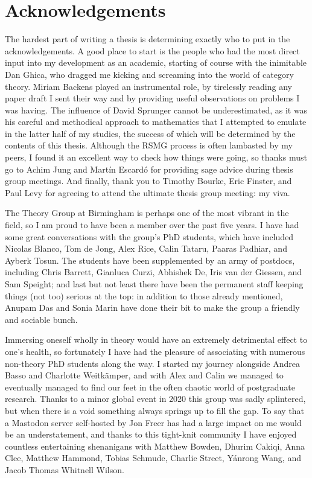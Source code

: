 \chapter{Acknowledgements}\label{chap:acknowledgements}

The hardest part of writing a thesis is determining exactly who to put in the
acknowledgements.
A good place to start is the people who had the most direct input into my
development as an academic, starting of course with the inimitable Dan Ghica,
who dragged me kicking and screaming into the world of category theory.
Miriam Backens played an instrumental role, by tirelessly reading any paper
draft I sent their way and by providing useful observations on problems I was
having.
The influence of David Sprunger cannot be underestimated, as it was his
careful and methodical approach to mathematics that I attempted to emulate in
the latter half of my studies, the success of which will be determined by the
contents of this thesis.
Although the RSMG process is often lambasted by my peers, I found it an
excellent way to check how things were going, so thanks must go to Achim Jung
and Martín Escardó for providing sage advice during thesis group meetings.
And finally, thank you to Timothy Bourke, Eric Finster, and Paul Levy for
agreeing to attend the ultimate thesis group meeting: my viva.

The Theory Group at Birmingham is perhaps one of the most vibrant in the field,
so I am proud to have been a member over the past five years.
I have had some great conversations with the group's PhD students, which have
included Nicolas Blanco, Tom de Jong, Alex Rice, Calin Tataru,
Paaras Padhiar, and Ayberk Tosun.
The students have been supplemented by an army of postdocs,
including Chris Barrett, Gianluca Curzi, Abhishek De, Iris van der Giessen, and
Sam Speight; and last but not least there have been the permanent staff keeping
things (not too) serious at the top: in addition to those already mentioned,
Anupam Das and Sonia Marin have done their bit to make the group a friendly and
sociable bunch.

Immersing oneself wholly in theory would have an extremely detrimental effect to
one's health, so fortunately I have had the pleasure of associating with
numerous non-theory PhD students along the way.
I started my journey alongside Andrea Basso and Charlotte Weitkämper, and with
Alex and Calin we managed to eventually managed to find our feet in the often
chaotic world of postgraduate research.
Thanks to a minor global event in 2020 this group was sadly splintered, but when
there is a void something always springs up to fill the gap.
To say that a Mastodon server self-hosted by Jon Freer has had a large impact on
me would be an understatement, and thanks to this tight-knit community I have
enjoyed countless entertaining shenanigans with Matthew Bowden, Dhurim Cakiqi,
Anna Clee, Matthew Hammond, Tobias Schmude, Charlie Street, Yánrong Wang, and
Jacob Thomas Whitnell Wilson.

